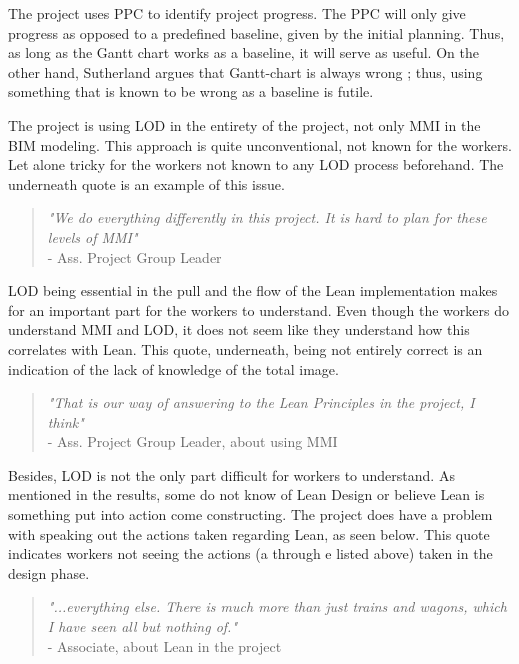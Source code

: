 The project uses PPC to identify project progress. The PPC will only give progress as opposed to a predefined baseline, given by the initial planning. Thus, as long as the Gantt chart works as a baseline, it will serve as useful. On the other hand, Sutherland argues that Gantt-chart is always wrong \citep{sutherland}; thus, using something that is known to be wrong as a baseline is futile.

The project is using LOD in the entirety of the project, not only MMI in the BIM modeling. This approach is quite unconventional, not known for the workers. Let alone tricky for the workers not known to any LOD process beforehand. The underneath quote is an example of this issue. 

\begin{quote}
    \textit{"We do everything differently in this project. It is hard to plan for these levels of MMI"} \\
    - Ass. Project Group Leader
\end{quote}

LOD being essential in the pull and the flow of the Lean implementation makes for an important part for the workers to understand. Even though the workers do understand MMI and LOD, it does not seem like they understand how this correlates with Lean. This quote, underneath, being not entirely correct is an indication of the lack of knowledge of the total image. 

\begin{quote}
    \textit{"That is our way of answering to the Lean Principles in the project, I think"} \\
    - Ass. Project Group Leader, about using MMI
\end{quote}

Besides, LOD is not the only part difficult for workers to understand. As mentioned in the results, some do not know of Lean Design or believe Lean is something put into action come constructing. The project does have a problem with speaking out the actions taken regarding Lean, as seen below. This quote indicates workers not seeing the actions (a through e listed above) taken in the design phase.

\begin{quote}
    \textit{"...everything else. There is much more than just trains and wagons, which I have seen all but nothing of."} \\
    - Associate, about Lean in the project 
\end{quote}

